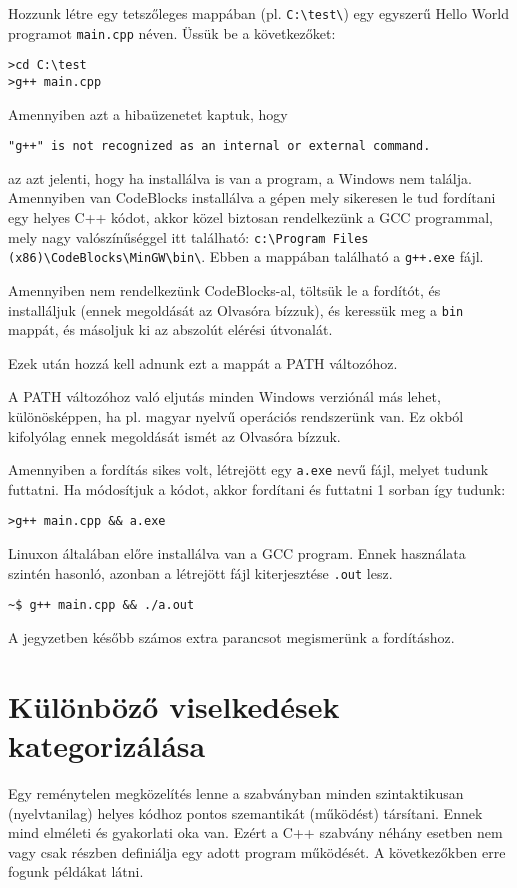 \documentclass[a4paper,11.5pt,table]{article}
\begin{document}
	Hozzunk létre egy tetszőleges mappában (pl. \texttt{C:\textbackslash test\textbackslash}) egy egyszerű Hello World programot \texttt{main.cpp} néven. Üssük be a következőket:
	\begin{lstlisting}
>cd C:\test
>g++ main.cpp
	\end{lstlisting}
	Amennyiben azt a hibaüzenetet kaptuk, hogy 
	
	{\centering\texttt{"g++" is not recognized as an internal or external command.}\par}
	
	az azt jelenti, hogy ha installálva is van a program, a Windows nem találja. Amennyiben van CodeBlocks installálva a gépen mely sikeresen le tud fordítani egy helyes C++ kódot, akkor közel biztosan rendelkezünk a GCC programmal, mely nagy valószínűséggel itt található: \texttt{c:\textbackslash Program Files (x86)\textbackslash CodeBlocks\textbackslash MinGW\textbackslash bin\textbackslash }. Ebben a mappában található a \texttt{g++.exe} fájl.
	 
	Amennyiben nem rendelkezünk CodeBlocks-al, töltsük le a fordítót, és installáljuk (ennek megoldását az Olvasóra bízzuk), és keressük meg a \texttt{bin} mappát, és másoljuk ki az abszolút elérési útvonalát.
	 
	Ezek után hozzá kell adnunk ezt a mappát a PATH változóhoz.
	\begin{note}
	 	A PATH változóhoz való eljutás minden Windows verziónál más lehet, különösképpen, ha pl. magyar nyelvű operációs rendszerünk van. Ez okból kifolyólag ennek megoldását ismét az Olvasóra bízzuk.
	\end{note}
	Amennyiben a fordítás sikes volt, létrejött egy \texttt{a.exe} nevű fájl, melyet tudunk futtatni. Ha módosítjuk a kódot, akkor fordítani és futtatni 1 sorban így tudunk:
	\begin{lstlisting}
>g++ main.cpp && a.exe
	\end{lstlisting}
	Linuxon általában előre installálva van a GCC program. Ennek használata szintén hasonló, azonban a létrejött fájl kiterjesztése \texttt{.out} lesz.
	\begin{lstlisting}
~$ g++ main.cpp && ./a.out
	\end{lstlisting}
	A jegyzetben később számos extra parancsot megismerünk a fordításhoz.
	\section{Különböző viselkedések kategorizálása}
	Egy reménytelen megközelítés lenne a szabványban minden szintaktikusan (nyelvtanilag) helyes kódhoz pontos szemantikát (működést) társítani. Ennek mind elméleti és gyakorlati oka van. Ezért a C++ szabvány néhány esetben nem vagy csak részben definiálja egy adott program működését. A következőkben erre fogunk példákat látni.
\end{document}
